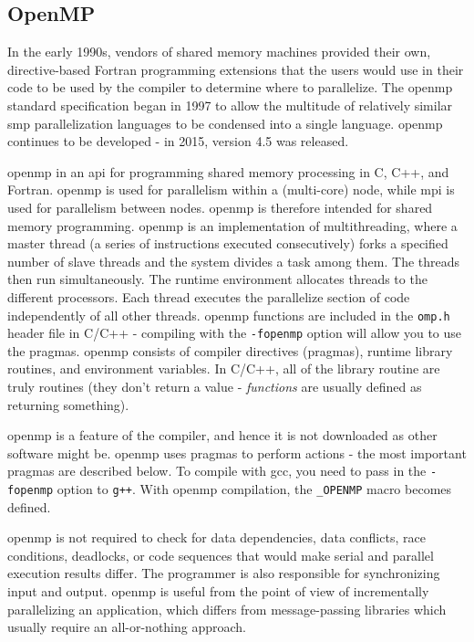 \documentclass[10pt]{article}
\begin{document}
\begin{flushleft}
\section{OpenMP}

In the early 1990s, vendors of shared memory machines provided their own, directive-based Fortran programming extensions that the users would use in their code to be used by the compiler to determine where to parallelize. The \gls{openmp} standard specification began in 1997 to allow the multitude of relatively similar \gls{smp} parallelization languages to be condensed into a single language. \gls{openmp} continues to be developed - in 2015, version 4.5 was released.

\gls{openmp} in an \gls{api} for programming shared memory processing in C, C++, and Fortran. \gls{openmp} is used for parallelism within a (multi-core) node, while \gls{mpi} is used for parallelism between nodes. \gls{openmp} is therefore intended for shared memory programming. \gls{openmp} is an implementation of multithreading, where a master thread (a series of instructions executed consecutively) forks a specified number of slave threads and the system divides a task among them. The threads then run simultaneously. The runtime environment allocates threads to the different processors. Each thread executes the parallelize section of code independently of all other threads. \gls{openmp} functions are included in the {\tt omp.h} header file in C/C++ - compiling with the {\tt -fopenmp} option will allow you to use the pragmas. \gls{openmp} consists of compiler directives (pragmas), runtime library routines, and environment variables. In C/C++, all of the library routine are truly routines (they don't return a value - \textit{functions} are usually defined as returning something). 

\gls{openmp} is a feature of the compiler, and hence it is not downloaded as other software might be. \gls{openmp} uses pragmas to perform actions - the most important pragmas are described below. To compile with gcc, you need to pass in the {\tt -fopenmp} option to {\tt g++}. With \gls{openmp} compilation, the {\tt \_OPENMP} macro becomes defined.

\gls{openmp} is not required to check for data dependencies, data conflicts, race conditions, deadlocks, or code sequences that would make serial and parallel execution results differ. The programmer is also responsible for synchronizing input and output. \gls{openmp} is useful from the point of view of incrementally parallelizing an application, which differs from message-passing libraries which usually require an all-or-nothing approach. 


\end{flushleft}
\end{document}
